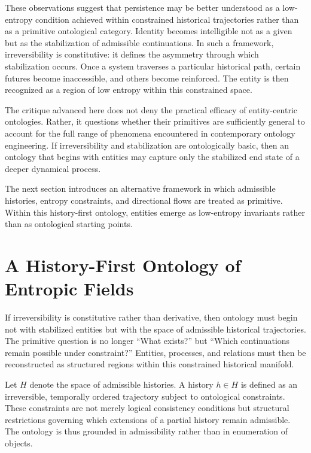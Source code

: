 \documentclass[12pt]{article}
\begin{document}
These observations suggest that persistence may be better understood as a low-entropy condition achieved within constrained historical trajectories rather than as a primitive ontological category. Identity becomes intelligible not as a given but as the stabilization of admissible continuations. In such a framework, irreversibility is constitutive: it defines the asymmetry through which stabilization occurs. Once a system traverses a particular historical path, certain futures become inaccessible, and others become reinforced. The entity is then recognized as a region of low entropy within this constrained space.

The critique advanced here does not deny the practical efficacy of entity-centric ontologies. Rather, it questions whether their primitives are sufficiently general to account for the full range of phenomena encountered in contemporary ontology engineering. If irreversibility and stabilization are ontologically basic, then an ontology that begins with entities may capture only the stabilized end state of a deeper dynamical process.

The next section introduces an alternative framework in which admissible histories, entropy constraints, and directional flows are treated as primitive. Within this history-first ontology, entities emerge as low-entropy invariants rather than as ontological starting points.

\section{A History-First Ontology of Entropic Fields}

If irreversibility is constitutive rather than derivative, then ontology must begin not with stabilized entities but with the space of admissible historical trajectories. The primitive question is no longer ``What exists?'' but ``Which continuations remain possible under constraint?'' Entities, processes, and relations must then be reconstructed as structured regions within this constrained historical manifold.

Let $H$ denote the space of admissible histories. A history $h \in H$ is defined as an irreversible, temporally ordered trajectory subject to ontological constraints. These constraints are not merely logical consistency conditions but structural restrictions governing which extensions of a partial history remain admissible. The ontology is thus grounded in admissibility rather than in enumeration of objects.
\end{document}
